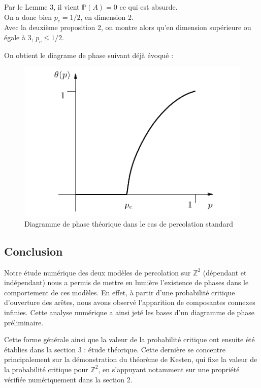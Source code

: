 \documentclass[11pt,a4paper]{article}
\begin{document}
Par le Lemme 3, il vient $\mathbb{P}\left(A\right) = 0$ ce qui est absurde.
\\

On a donc bien $p_c = 1/2$, en dimension 2.
\\

Avec la deuxième proposition 2, on montre alors qu'en dimension supérieure ou égale à $3$, $p_c \le 1/2$.

On obtient le diagrame de phase suivant déjà évoqué :


\begin{figure}[H]
    \centering
    \includegraphics[width=0.4 \textwidth]{./Pictures/ph_th.png}
    \caption{Diagramme de phase théorique dans le cas de percolation standard \cite{grimmett}}
    \label{fig:phase_th}
\end{figure}


\subsection{Conclusion}

Notre étude numérique des deux modèles de percolation sur $\mathbb{Z}^2$ (dépendant et indépendant) nous a permis de mettre en lumière l'existence de phases dans le comportement de ces modèles. En effet, à partir d'une probabilité critique d'ouverture des arêtes, nous avons observé l'apparition de composantes connexes infinies. Cette analyse numérique a ainsi jeté les bases d'un diagramme de phase préliminaire.

Cette forme générale ainsi que la valeur de la probabilité critique ont ensuite été établies dans la section 3 : étude théorique. Cette dernière se concentre principalement sur la démonstration du théorème de Kesten, qui fixe la valeur de la probabilité critique pour $\mathbb{Z}^2$, en s'appuyant notamment sur une propriété vérifiée numériquement dans la section 2.


\printbibliography[heading=bibintoc, title={Références}]
\end{document}
